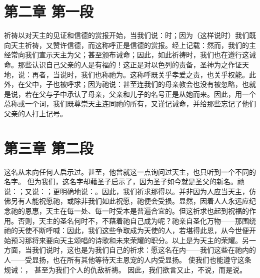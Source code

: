 \section{第二章 第一段}

祈祷以对天主的见证和信德的赏报开始，当我们说：时；因为（这样说时）我们既向天主祈祷，又赞许信德，而这称呼正是信德的赏报。经上记载：然而，我们的主经常向我们宣示天主为父；甚至颁布诫命；因此，如此祈祷时，我们也在遵行这诫命。那些认识自己父亲的人是有福的！这正是对以色列的责备，圣神为之作证天地，说：再者，当说时，我们也称祂为。这称呼既关乎孝爱之责，也关乎权能。此外，在父中，子也被呼求；因为祂说：甚至连我们的母亲教会也没有被忽略，也就是说，若在父与子中承认了母亲，父亲和儿子的名号正是从她而来。因此，用一个总称或一个词，我们既尊崇天主连同祂的所有，又谨记诫命，并给那些忘记了他们父亲的人打上记号。\par


\section{第三章 第二段}

这名从未向任何人启示过。甚至，他曾就这一点询问过天主，也只听到一个不同的名字。 但为我们，这名字却藉圣子启示了，因为圣子如今就是圣父的新名。祂说：；又说：；更明确地说：。因此，我们祈求那得以。并非因为人应当天主，仿佛另有人能祝愿祂，或除非我们如此祝愿，祂便会受损。显然，因着人人永远应纪念祂的恩惠，天主在每一处、每一时受本是普遍合宜的。但这祈求也起到祝福的作用。否则，天主的圣名何时不，不藉着祂自己成为呢？祂亲自圣化万物——那围绕祂的天使不断呼喊：因此，我们这些争取成为天使的人，若堪得此恩，从今世便开始预习那将来要向天主颂唱的诗歌和未来荣耀的职分。以上是为天主的荣耀。另一方面，当我们说时，这也是为我们自己的祈求：愿这名在内——我们这些在祂内的人——受显扬，也在所有其他等待天主恩宠的人内受显扬。 使我们也能遵守这条规诫：， 甚至为我们个人的仇敌祈祷。 因此，我们欲言又止，不说，而是说。\par

